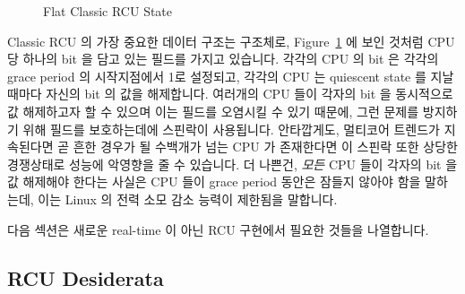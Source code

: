 \begin{figure}[htb]
\centering
{}
\caption{Flat Classic RCU State}
\label{fig:app:rcuimpl:rcutree:Flat Classic RCU State}
\end{figure}

Classic RCU 의 가장 중요한 데이터 구조는  구조체로,
Figure~\ref{fig:app:rcuimpl:rcutree:Flat Classic RCU State} 에 보인 것처럼 CPU
당 하나의 bit 을 담고 있는  필드를 가지고 있습니다.
각각의 CPU 의 bit 은 각각의 grace period 의 시작지점에서 1로 설정되고, 각각의
CPU 는 quiescent state 를 지날 때마다 자신의 bit 의 값을 해제합니다.
여러개의 CPU 들이 각자의 bit 을 동시적으로 값 해제하고자 할 수 있으며 이는
 필드를 오염시킬 수 있기 때문에, 그런 문제를 방지하기 위해
 필드를 보호하는데에  스핀락이 사용됩니다.
안타깝게도, 멀티코어 트렌드가 지속된다면 곧 흔한 경우가 될 수백개가 넘는 CPU 가
존재한다면 이 스핀락 또한 상당한 경쟁상태로 성능에 악영향을 줄 수 있습니다.
더 나쁜건, \emph{모든} CPU 들이 각자의 bit 을 값 해제해야 한다는 사실은 CPU
들이 grace period 동안은 잠들지 않아야 함을 말하는데, 이는 Linux 의 전력 소모
감소 능력이 제한됨을 말합니다.

다음 섹션은 새로운 real-time 이 아닌 RCU 구현에서 필요한 것들을 나열합니다.
\iffalse

Classic RCU's most important data structure is the \co{rcu_ctrlblk}
structure, which contains the \co{->cpumask} field, which contains
one bit per CPU, as shown in
Figure~\ref{fig:app:rcuimpl:rcutree:Flat Classic RCU State}.
Each CPU's bit is set to one at the beginning of each grace period,
and each CPU must clear its bit after it passes through a quiescent
state.
Because multiple CPUs might want to clear their bits concurrently,
which would corrupt the \co{->cpumask} field, a
\co{->lock}
spinlock is used to protect \co{->cpumask}, preventing any
such corruption.
Unfortunately, this spinlock can also suffer extreme contention if there
are more than a few hundred CPUs, which might soon become quite common
if multicore trends continue.
Worse yet, the fact that \emph{all} CPUs must clear their own bit means
that CPUs are not permitted to sleep through a grace period, which limits
Linux's ability to conserve power.




The next section lays out what we need from a new non-real-time
RCU implementation.
\fi

\subsection{RCU Desiderata}
\label{app:rcuimpl:rcutree:RCU Desiderata}

